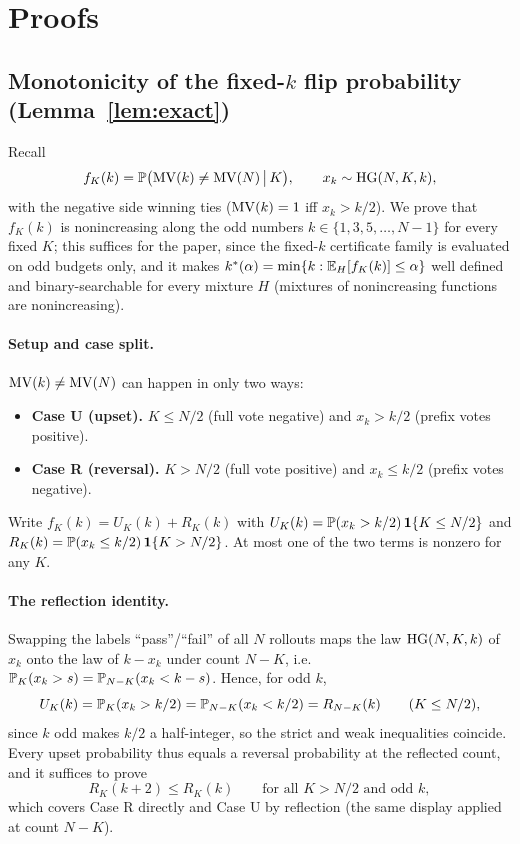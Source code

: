 \section{Proofs}
\label{app:proofs}

\subsection{Monotonicity of the fixed-$k$ flip probability (Lemma~\ref{lem:exact})}

Recall
\[
f_K(k)=\P\big(\MV(k)\neq\MV(N)\,\big|\,K\big),
\qquad x_k\sim\HG(N,K,k),
\]
with the negative side winning ties ($\MV(k)=1$ iff $x_k>k/2$).
We prove that $f_K(k)$ is nonincreasing along the odd numbers
$k\in\{1,3,5,\dots,N-1\}$ for every fixed $K$; this suffices for the paper,
since the fixed-$k$ certificate family is evaluated on odd budgets only, and
it makes $k^*(\alpha)=\min\{k:\E_H[f_K(k)]\le\alpha\}$ well defined and
binary-searchable for every mixture $H$ (mixtures of nonincreasing functions
are nonincreasing).

\paragraph{Setup and case split.}
$\MV(k)\neq\MV(N)$ can happen in only two ways:
\begin{itemize}
\item \textbf{Case U (upset).} $K\le N/2$ (full vote negative) and $x_k>k/2$
(prefix votes positive).
\item \textbf{Case R (reversal).} $K>N/2$ (full vote positive) and $x_k\le k/2$
(prefix votes negative).
\end{itemize}
Write $f_K(k)=U_K(k)+R_K(k)$ with $U_K(k)=\P(x_k>k/2)\,\mathbf 1\{K\le N/2\}$
and $R_K(k)=\P(x_k\le k/2)\,\mathbf 1\{K>N/2\}$. At most one of the two terms
is nonzero for any $K$.

\paragraph{The reflection identity.}
Swapping the labels ``pass''/``fail'' of all $N$ rollouts maps the law
$\HG(N,K,k)$ of $x_k$ onto the law of $k-x_k$ under count $N-K$, i.e.\
$\P_{K}(x_k>s)=\P_{N-K}(x_k<k-s)$. Hence, for odd $k$,
\[
U_K(k)=\P_K(x_k>k/2)=\P_{N-K}(x_k<k/2)=R_{N-K}(k)
\qquad(K\le N/2),
\]
since $k$ odd makes $k/2$ a half-integer, so the strict and weak
inequalities coincide. Every upset probability thus equals a reversal
probability at the reflected count, and it suffices to prove
\begin{equation}
\label{eq:revmain}
R_K(k+2)\le R_K(k)\qquad\text{for all }K>N/2\text{ and odd }k,
\end{equation}
which covers Case R directly and Case U by reflection (the same display
applied at count $N-K$).

